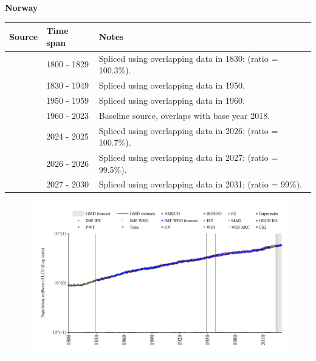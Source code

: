 \documentclass[12pt,a4paper,landscape]{article}
\begin{document}
\begin{adjustbox}{max totalsize={\paperwidth}{\paperheight},center}
\begin{minipage}[t][\textheight][t]{\textwidth}
\vspace*{0.5cm}
{}
\begin{center}
{\Large\bfseries Norway}
\end{center}
\vspace{0.5cm}
\begin{table}[H]
\centering
\small
\begin{tabular}{|l|l|l|}
\hline
\textbf{Source} & \textbf{Time span} & \textbf{Notes} \\
\hline
\rowcolor{white}\cite{Gapminder}& 1800 - 1829 &Spliced using overlapping data in 1830: (ratio = 100.3\%).\\
\rowcolor{lightgray}\cite{CS2_NOR}& 1830 - 1949 &Spliced using overlapping data in 1950.\\
\rowcolor{white}\cite{IMF_IFS}& 1950 - 1959 &Spliced using overlapping data in 1960.\\
\rowcolor{lightgray}\cite{WDI}& 1960 - 2023 &Baseline source, overlaps with base year 2018.\\
\rowcolor{white}\cite{OECD_EO}& 2024 - 2025 &Spliced using overlapping data in 2026: (ratio = 100.7\%).\\
\rowcolor{lightgray}\cite{AMECO}& 2026 - 2026 &Spliced using overlapping data in 2027: (ratio = 99.5\%).\\
\rowcolor{white}\cite{Gapminder}& 2027 - 2030 &Spliced using overlapping data in 2031: (ratio = 99\%).\\
\hline
\end{tabular}
\end{table}
\begin{figure}[H]
\centering
\includegraphics[width=\textwidth,height=0.6\textheight,keepaspectratio]{graphs/NOR_pop.pdf}
\end{figure}
\end{minipage}
\end{adjustbox}
\end{document}
